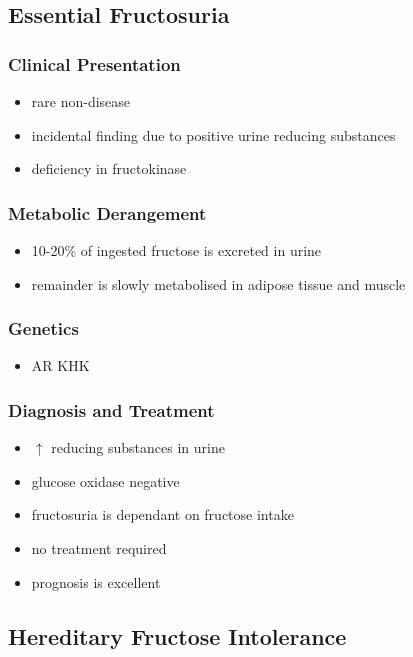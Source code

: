 \documentclass{scrartcl}
\begin{document}
\subsection{Essential Fructosuria}
\label{sec:org87dc397}
\subsubsection{Clinical Presentation}
\label{sec:org46dfb8a}
\begin{itemize}
\item rare non-disease
\item incidental finding due to positive urine reducing substances
\item deficiency in fructokinase
\end{itemize}
\subsubsection{Metabolic Derangement}
\label{sec:org3a3e87c}
\begin{itemize}
\item 10-20\% of ingested fructose is excreted in urine
\item remainder is slowly metabolised in adipose tissue and muscle
\end{itemize}
\subsubsection{Genetics}
\label{sec:org834aa59}
\begin{itemize}
\item AR KHK
\end{itemize}
\subsubsection{Diagnosis and Treatment}
\label{sec:orgfc5dd9e}
\begin{itemize}
\item \(\uparrow\) reducing substances in urine
\item glucose oxidase negative
\item fructosuria is dependant on fructose intake
\item no treatment required
\item prognosis is excellent
\end{itemize}

\subsection{Hereditary Fructose Intolerance}
\label{sec:org4aa9686}
\end{document}
